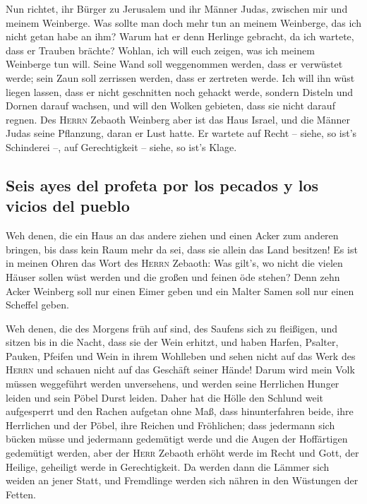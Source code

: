  Nun richtet, ihr Bürger zu Jerusalem und ihr Männer
Judas, zwischen mir und meinem Weinberge.  Was sollte man
doch mehr tun an meinem Weinberge, das ich nicht getan habe an ihm?
Warum hat er denn Herlinge gebracht, da ich wartete, dass er Trauben
brächte?  Wohlan, ich will euch zeigen, was ich meinem
Weinberge tun will. Seine Wand soll weggenommen werden, dass er
verwüstet werde; sein Zaun soll zerrissen werden, dass er zertreten
werde.  Ich will ihn wüst liegen lassen, dass er nicht
geschnitten noch gehackt werde, sondern Disteln und Dornen darauf
wachsen, und will den Wolken gebieten, dass sie nicht darauf regnen.
 Des \textsc{Herrn} Zebaoth Weinberg aber ist das Haus
Israel, und die Männer Judas seine Pflanzung, daran er Lust hatte. Er
wartete auf Recht -- siehe, so ist's Schinderei --, auf Gerechtigkeit --
siehe, so ist's Klage.

\hypertarget{seis-ayes-del-profeta-por-los-pecados-y-los-vicios-del-pueblo}{%
\subsection{Seis ayes del profeta por los pecados y los vicios del
pueblo}\label{seis-ayes-del-profeta-por-los-pecados-y-los-vicios-del-pueblo}}

 Weh denen, die ein Haus an das andere ziehen und einen
Acker zum anderen bringen, bis dass kein Raum mehr da sei, dass sie
allein das Land besitzen!  Es ist in meinen Ohren das Wort
des \textsc{Herrn} Zebaoth: Was gilt's, wo nicht die vielen Häuser
sollen wüst werden und die großen und feinen öde stehen? 
Denn zehn Acker Weinberg soll nur einen Eimer geben und ein Malter Samen
soll nur einen Scheffel geben.

 Weh denen, die des Morgens früh auf sind, des Saufens
sich zu fleißigen, und sitzen bis in die Nacht, dass sie der Wein
erhitzt,  und haben Harfen, Psalter, Pauken, Pfeifen und
Wein in ihrem Wohlleben und sehen nicht auf das Werk des \textsc{Herrn}
und schauen nicht auf das Geschäft seiner Hände!  Darum
wird mein Volk müssen weggeführt werden unversehens, und werden seine
Herrlichen Hunger leiden und sein Pöbel Durst leiden. 
Daher hat die Hölle den Schlund weit aufgesperrt und den Rachen aufgetan
ohne Maß, dass hinunterfahren beide, ihre Herrlichen und der Pöbel, ihre
Reichen und Fröhlichen;  dass jedermann sich bücken müsse
und jedermann gedemütigt werde und die Augen der Hoffärtigen gedemütigt
werden,  aber der \textsc{Herr} Zebaoth erhöht werde im
Recht und Gott, der Heilige, geheiligt werde in Gerechtigkeit.
 Da werden dann die Lämmer sich weiden an jener Statt,
und Fremdlinge werden sich nähren in den Wüstungen der Fetten.

